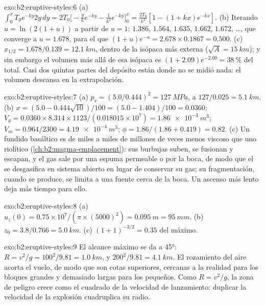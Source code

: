 \begin{solution}{exo:b2:eruptive-styles:6}
(a) $\int_0^x T_0e^{-ky}2y\,dy = 2T_0\big[-\tfrac{y}{k}e^{-ky} - \tfrac{1}{k^2}e^{-ky}\big]_0^x
= \tfrac{2T_0}{k^2}[1 - (1 + kx)e^{-kx}]$. (b) Iterando $u = \ln(2(1 + u))$ a partir de
$u = 1$: $1.386$, $1.564$, $1.635$, $1.662$, $1.672$, \dots, que converge a
$u = 1.678$, para el que $(1 + u)e^{-u} = 2.678\times0.1867 = 0.500$. (c) $x_{1/2} =
1.678/0.139 = \qty{12.1}{km}$, dentro de la isópaca más externa ($\sqrt A =
\qty{15}{km}$); y sin embargo el volumen más allá de esa isópaca es $(1 + 2.09)e^{-2.09} =
\qty{38}{\percent}$ del total. Casi dos quintas partes del depósito están donde
no se midió nada: el volumen descansa en la extrapolación.
\end{solution}

\begin{solution}{exo:b2:eruptive-styles:7}
(a) $p_s = (5.0/0.444)^2 = \qty{127}{MPa}$, a $127/0.025 = \qty{5.1}{km}$.
(b) $x = (5.0 - 0.444\sqrt{10})/100 = (5.0 - 1.404)/100 = 0.0360$;
$V_g = 0.0360\times8.314\times1123/(0.018015\times10^7) = \qty{1.86e-3}{m^3}$;
$V_m = 0.964/2300 = \qty{4.19e-4}{m^3}$; $\phi = 1.86/(1.86 + 0.419) = 0.82$.
(c) Un fundido basáltico es de miles a miles de millones de veces menos viscoso que uno
riolítico (\cref{ch:b2:magma-emplacement}): sus burbujas suben,
se fusionan y escapan, y el gas sale por una espuma permeable o por la
boca, de modo que el  se desgasifica en sistema abierto en lugar de conservar su gas; su
fragmentación, cuando se produce, se limita a una fuente cerca de la boca. Un ascenso más lento
deja más tiempo para ello.
\end{solution}

\begin{solution}{exo:b2:eruptive-styles:8}
(a) $u_z(0) = 0.75\times10^7/(\pi\times(5000)^2) = \qty{0.095}{m} = \qty{95}{mm}$.
(b) $z_0 = 3.8/0.766 = \qty{5.0}{km}$. (c) $(1 + 1)^{-3/2} = 0.35$ del
máximo.
\end{solution}

\begin{solution}{exo:b2:eruptive-styles:9}
El alcance máximo se da a \ang{45}: $R = v^2/g = 100^2/9.81 = \qty{1.0}{km}$, y
$200^2/9.81 = \qty{4.1}{km}$. El rozamiento del aire acorta el vuelo, de modo que son
cotas superiores, cercanas a la realidad para los bloques grandes y demasiado largas para los pequeños.
Como $R = v^2/g$, la zona de peligro crece como el cuadrado de la velocidad de lanzamiento:
duplicar la velocidad de la explosión cuadruplica su radio.
\end{solution}

